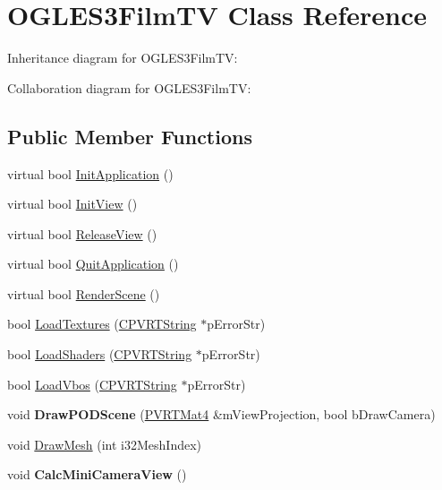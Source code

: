\hypertarget{class_o_g_l_e_s3_film_t_v}{\section{O\+G\+L\+E\+S3\+Film\+T\+V Class Reference}
\label{class_o_g_l_e_s3_film_t_v}
}


Inheritance diagram for O\+G\+L\+E\+S3\+Film\+T\+V\+:


Collaboration diagram for O\+G\+L\+E\+S3\+Film\+T\+V\+:
\subsection*{Public Member Functions}
\begin{DoxyCompactItemize}
\item 
virtual bool \hyperlink{class_o_g_l_e_s3_film_t_v_a1700314a935cd949ffcbbc5f36ecaddc}{Init\+Application} ()
\item 
virtual bool \hyperlink{class_o_g_l_e_s3_film_t_v_aa18bf366e621fd15d5e970f833baabae}{Init\+View} ()
\item 
virtual bool \hyperlink{class_o_g_l_e_s3_film_t_v_a5abb235762319b10bbc62ac860f76939}{Release\+View} ()
\item 
virtual bool \hyperlink{class_o_g_l_e_s3_film_t_v_af468481a46c426bdc2a5c369c137dd77}{Quit\+Application} ()
\item 
virtual bool \hyperlink{class_o_g_l_e_s3_film_t_v_a2ee46b2c880dabc5eda474e0d202619b}{Render\+Scene} ()
\item 
bool \hyperlink{class_o_g_l_e_s3_film_t_v_a31ffd7f6fd605617a316e3b89b9841c9}{Load\+Textures} (\hyperlink{class_c_p_v_r_t_string}{C\+P\+V\+R\+T\+String} $\ast$p\+Error\+Str)
\item 
bool \hyperlink{class_o_g_l_e_s3_film_t_v_a42f28065333cb617fc8ad42cdaa3eb0c}{Load\+Shaders} (\hyperlink{class_c_p_v_r_t_string}{C\+P\+V\+R\+T\+String} $\ast$p\+Error\+Str)
\item 
bool \hyperlink{class_o_g_l_e_s3_film_t_v_a185802251a0494ab523540c4ed336447}{Load\+Vbos} (\hyperlink{class_c_p_v_r_t_string}{C\+P\+V\+R\+T\+String} $\ast$p\+Error\+Str)
\item 
\hypertarget{class_o_g_l_e_s3_film_t_v_a0d41e1ad6568341a693f7daf4d972cd8}{void {\bfseries Draw\+P\+O\+D\+Scene} (\hyperlink{struct_p_v_r_t_mat4}{P\+V\+R\+T\+Mat4} \&m\+View\+Projection, bool b\+Draw\+Camera)}\label{class_o_g_l_e_s3_film_t_v_a0d41e1ad6568341a693f7daf4d972cd8}

\item 
void \hyperlink{class_o_g_l_e_s3_film_t_v_ab1e091b0024e1c360f48663031d638a3}{Draw\+Mesh} (int i32\+Mesh\+Index)
\item 
\hypertarget{class_o_g_l_e_s3_film_t_v_a4423bda3b5aade71839a5785b4726cf6}{void {\bfseries Calc\+Mini\+Camera\+View} ()}\label{class_o_g_l_e_s3_film_t_v_a4423bda3b5aade71839a5785b4726cf6}

\end{DoxyCompactItemize}


